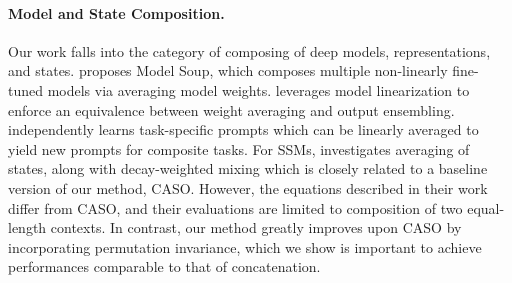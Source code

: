 \paragraph{Model and State Composition.}
Our work falls into the category of 
composing of deep models, representations, and states. \cite{wortsman2022model} proposes Model Soup, which composes multiple non-linearly fine-tuned models via averaging model weights. \cite{liu2023tangent1,liu2023tangent2} leverages model linearization to enforce an equivalence between weight averaging and output ensembling. \cite{perera2023prompt} independently learns task-specific prompts which can be linearly averaged to yield new prompts for composite tasks.
For SSMs, \cite{pioro2024state} investigates averaging of states, along with decay-weighted mixing which is closely related to a baseline version of our method, CASO. However, the equations described in their work differ from CASO, and their evaluations are limited to composition of two equal-length contexts. In contrast, our method greatly improves upon CASO by incorporating permutation invariance, which we show is important to achieve performances comparable to that of concatenation.